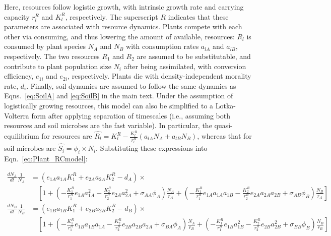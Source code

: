 \noindent Here, resources follow logistic growth, with intrinsic growth rate and carrying capacity $r_{l}^{R}$ and $K_{l}^{R}$, respectively. The superscript $R$ indicates that these parameters are associated with resource dynamics. Plants compete with each other via consuming, and thus lowering the amount of available, resources: $R_{l}$ is consumed by plant species $N_{A}$ and $N_{B}$ with consumption rates $a_{lA}$ and $a_{lB}$, respectively. The two resources $R_{1}$ and $R_{2}$ are assumed to be substitutable, and contribute to plant population size $N_{i}$ after being assimilated, with conversion efficiency, $e_{1i}$ and $e_{2i}$, respectively. Plants die with density-independent morality rate, $d_{i}$. Finally, soil dynamics are assumed to follow the same dynamics as Eqns.~\ref{eq:SoilA} and \ref{eq:SoilB} in the main text. Under the assumption of logistically growing resources, this model can also be simplified to a Lotka-Volterra form after applying separation of timescales (i.e., assuming both resources and soil microbes are the fast variable).
In particular, the quasi-equilibrium for resources are $\hat{R_{l}}= K_{l}^{R} - \frac{K_{l}^{R}}{r_{l}^{R}} \left ( a_{lA}N_{A}+a_{lB}N_{B} \right )$, whereas that for soil microbes are $\hat{S_{i}}= \phi_{i} \times N_{i}$. Substituting these expressions into Eqn.~\ref{eq:Plant_RCmodel}:

\makeatletter
\def\tagform@#1{\maketag@@@{\normalsize(#1)\@@italiccorr}}
\makeatother
\footnotesize
\begin{equation}
\begin{split}
\frac{dN_{A}}{dt}\frac{1}{N_{A}}& = \left ( e_{1A}a_{1A}K_{1}^{R} + e_{2A}a_{2A}K_{2}^{R} - d_{A} \right ) \times \\
& \quad \left [ 1 +
\left ( -\frac{ K_{1}^{R}}{r_{1}^{R}}e_{1A}a_{1A}^{2} - \frac{K_{2}^{R}}{r_{2}^{R}}e_{2A}a_{2A}^{2} + \sigma_{AA}\phi_{A} \right )\frac{N_{A}}{r_{A}}
+ \left ( -\frac{ K_{1}^{R}}{r_{1}^{R}}e_{1A}a_{1A}a_{1B} - \frac{K_{2}^{R}}{r_{2}^{R}}e_{2A}a_{2A}a_{2B} + \sigma_{AB}\phi_{B} \right )\frac{N_{B}}{r_{A}} \right ]
\end{split}
\tag{S4.4}\label{eq:LVA_RCmodel}
\end{equation}
\begin{equation}
\begin{split}
\frac{dN_{B}}{dt}\frac{1}{N_{B}}& = \left ( e_{1B}a_{1B}K_{1}^{R} + e_{2B}a_{2B}K_{2}^{R} - d_{B} \right ) \times \\
& \quad \left [ 1 +
\left ( -\frac{ K_{1}^{R}}{r_{1}^{R}}e_{1B}a_{1B}a_{1A} - \frac{K_{2}^{R}}{r_{2}^{R}}e_{2B}a_{2B}a_{2A} + \sigma_{BA}\phi_{A} \right )\frac{N_{A}}{r_{B}}
+ \left ( -\frac{ K_{1}^{R}}{r_{1}^{R}}e_{1B}a_{1B}^{2} - \frac{K_{2}^{R}}{r_{2}^{R}}e_{2B}a_{2B}^{2} + \sigma_{BB}\phi_{B} \right )\frac{N_{B}}{r_{B}} \right ]
\end{split}
\tag{S4.5}\label{eq:LVB_RCmodel}
\end{equation}
\normalsize

